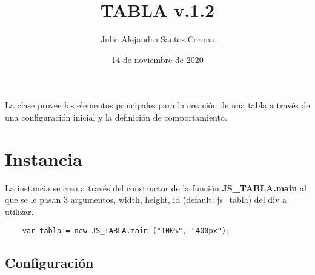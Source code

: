 \documentclass[10pt]{article}
\title{TABLA v.1.2}
\author{Julio Alejandro Santos Corona}
\date{14 de noviembre de 2020}
\begin{document}

\lstset{breaklines=true, tabsize=4, language=JavaScript}

\maketitle

La clase provee los elementos principales para la creación de una tabla a través de una configuración inicial y la definición de comportamiento.

\section{Instancia}

La instancia se crea a través del constructor de la función \textbf{JS\_TABLA.main} al que se le pasan 3 argumentos, width, height, id (default: js\_tabla) del div a utilizar.
\\
\begin{lstlisting}
	var tabla = new JS_TABLA.main ("100%", "400px");
\end{lstlisting}

\subsection{Configuración}
\end{document}
